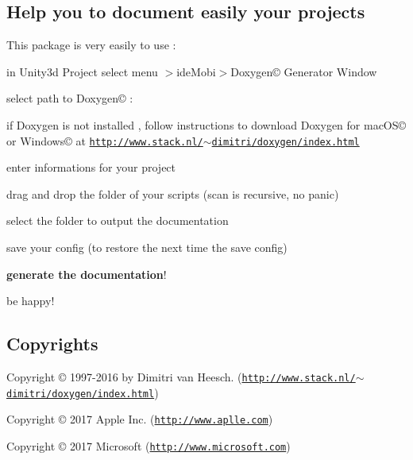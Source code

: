 \subsection*{Help you to document easily your projects}

This package is very easily to use \+:


\begin{DoxyItemize}
\item in Unity3d Project select menu $>$ide\+Mobi$>$Doxygen© Generator Window
\item select path to Doxygen© \+:
\begin{DoxyItemize}
\item if Doxygen is not installed , follow instructions to download Doxygen for mac\+O\+S© or Windows© at \href{http://www.stack.nl/~dimitri/doxygen/index.html}{\tt http\+://www.\+stack.\+nl/$\sim$dimitri/doxygen/index.\+html}
\end{DoxyItemize}
\item enter informations for your project
\item drag and drop the folder of your scripts (scan is recursive, no panic)
\item select the folder to output the documentation
\item save your config (to restore the next time the save config)
\item {\bfseries generate the documentation}!
\item be happy!
\end{DoxyItemize}

\subsection*{Copyrights}


\begin{DoxyItemize}
\item Copyright © 1997-\/2016 by Dimitri van Heesch. (\href{http://www.stack.nl/~dimitri/doxygen/index.html}{\tt http\+://www.\+stack.\+nl/$\sim$dimitri/doxygen/index.\+html})
\item Copyright © 2017 Apple Inc. (\href{http://www.aplle.com}{\tt http\+://www.\+aplle.\+com})
\item Copyright © 2017 Microsoft (\href{http://www.microsoft.com}{\tt http\+://www.\+microsoft.\+com}) 
\end{DoxyItemize}